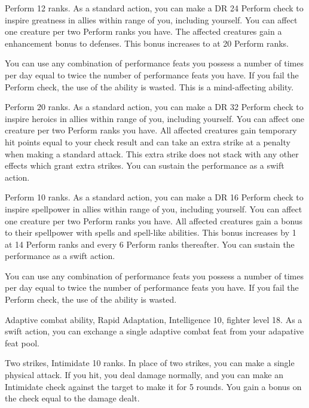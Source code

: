 \featpre Perform 12 ranks.
\featben As a standard action, you can make a DR 24 Perform check to inspire greatness in allies within \rngmed range of you, including yourself.
You can affect one creature per two Perform ranks you have.
The affected creatures gain a  enhancement bonus to defenses.
This bonus increases to  at 20 Perform ranks.

You can use any combination of performance feats you possess a number of times per day equal to twice the number of performance feats you have.
If you fail the Perform check, the use of the ability is wasted.
This is a mind-affecting ability.

\featpre Perform 20 ranks.
\featben As a standard action, you can make a DR 32 Perform check to inspire heroics in allies within \rngmed range of you, including yourself.
You can affect one creature per two Perform ranks you have.
All affected creatures gain temporary hit points equal to your check result and can take an extra strike at a  penalty when making a standard attack.
This extra strike does not stack with any other effects which grant extra strikes.
You can sustain the performance as a swift action.

\featpre Perform 10 ranks.
\featben As a standard action, you can make a DR 16 Perform check to inspire spellpower in allies within \rngmed range of you, including yourself.
You can affect one creature per two Perform ranks you have.
All affected creatures gain a  bonus to their spellpower with spells and spell-like abilities.
This bonus increases by 1 at 14 Perform ranks and every 6 Perform ranks thereafter.
You can sustain the performance as a swift action.

You can use any combination of performance feats you possess a number of times per day equal to twice the number of performance feats you have.
If you fail the Perform check, the use of the ability is wasted.

\featpre Adaptive combat ability, Rapid Adaptation, Intelligence 10, fighter level 18.
\featben As a swift action, you can exchange a single adaptive combat feat from your adapative feat pool.

\featpres Two strikes, Intimidate 10 ranks.
\featben In place of two strikes, you can make a single physical attack.
If you hit, you deal damage normally, and you can make an Intimidate check against the target to make it \shaken for 5 rounds.
You gain a bonus on the check equal to the damage dealt.

